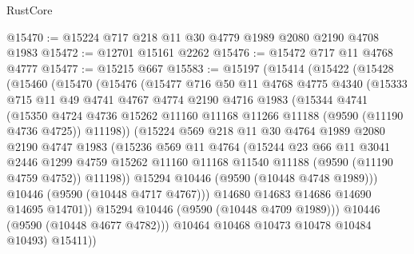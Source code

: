 \begin{lexlean}{RustCore}
\begin{coremodule}
@15470 := @15224 @717 @218 @11 @30 @4779 @1989 @2080 @2190 @4708 @1983
@15472 := @12701 @15161 @2262
@15476 := @15472 @717 @11 @4768 @4777
@15477 := @15215 @667
@15583 := @15197
    (@15414
      (@15422
        (@15428
          (@15460
            (@15470
              (@15476
                (@15477
                  @716
                  @50
                  @11
                  @4768
                  @4775
                  @4340
                  (@15333
                    @715
                    @11
                    @49
                    @4741
                    @4767
                    @4774
                    @2190
                    @4716
                    @1983
                    (@15344
                      @4741
                      (@15350
                        @4724
                        @4736
                        @15262
                        @11160
                        @11168
                        @11266
                        @11188
                        (@9590 (@11190 @4736 @4725))
                        @11198))
                    (@15224
                      @569
                      @218
                      @11
                      @30
                      @4764
                      @1989
                      @2080
                      @2190
                      @4747
                      @1983
                      (@15236
                        @569
                        @11
                        @4764
                        (@15244
                          @23
                          @66
                          @11
                          @3041
                          @2446
                          @1299
                          @4759
                          @15262
                          @11160
                          @11168
                          @11540
                          @11188
                          (@9590 (@11190 @4759 @4752))
                          @11198))
                      @15294
                      @10446
                      (@9590 (@10448 @4748 @1989)))
                    @10446
                    (@9590 (@10448 @4717 @4767)))
                  @14680
                  @14683
                  @14686
                  @14690
                  @14695
                  @14701))
              @15294
              @10446
              (@9590 (@10448 @4709 @1989)))
            @10446
            (@9590 (@10448 @4677 @4782)))
          @10464
          @10468
          @10473
          @10478
          @10484
          @10493)
        @15411))

\end{coremodule}
\end{lexlean}
